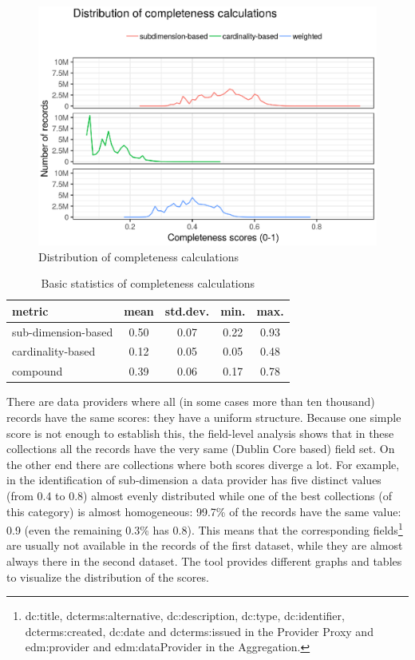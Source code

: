 \begin{figure}[ht]
\includegraphics[width=\textwidth]{images/chapter02/completeness-score-histogram.eps}
\centering
\caption{Distribution of completeness calculations}
\label{fig:completeness}
\end{figure}

\begin{table}
\caption{Basic statistics of completeness calculations}
\label{table:completeness_metrics}
\centering
\begin{tabular}{l|c|c|c|c}
metric & mean & std.dev. & min. & max. \\
\hline
sub-dimension-based & 0.50 & 0.07 & 0.22 & 0.93 \\
cardinality-based & 0.12 & 0.05 & 0.05 & 0.48 \\
compound & 0.39 & 0.06 & 0.17 & 0.78 \\
\end{tabular}
\end{table}

There are data providers where all (in some cases more than ten thousand) records have the same scores: they have a uniform structure. Because one simple score is not enough to establish this, the field-level analysis shows that in these collections all the records have the very same (Dublin Core based) field set. On the other end there are collections where both scores diverge a lot. For example, in the identification of sub-dimension a data provider has five distinct values (from 0.4 to 0.8) almost evenly distributed while one of the best collections (of this category) is almost homogeneous: 99.7\% of the records have the same value: 0.9 (even the remaining 0.3\% has 0.8). This means that the corresponding fields\footnote{dc:title, dcterms:alternative, dc:description, dc:type, dc:identifier, dcterms:created, dc:date and dcterms:issued in the Provider Proxy and edm:provider and edm:dataProvider in the Aggregation.} are usually not available in the records of the first dataset, while they are almost always there in the second dataset. The tool provides different graphs and tables to visualize the distribution of the scores. 

